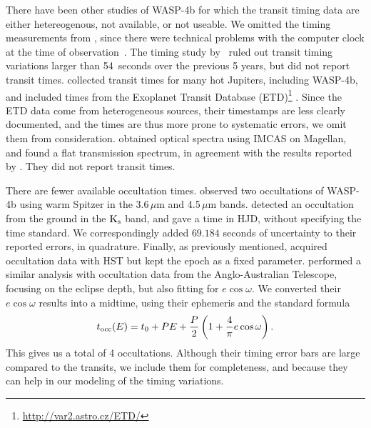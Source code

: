 \documentclass[12pt,twocolumn,tighten]{aastex62}
\begin{document}
There have been other studies of WASP-4b for which the transit timing
data are either hetereogenous, not available, or not useable.  We
omitted the timing measurements from
\citet{southworth_high-precision_2009}, since there were
technical problems with the computer clock at the time of
observation~\citep{nikolov_wasp-4b_2012}.  The timing study
by~\citet{petrucci_no_2013} ruled out transit timing variations larger
than 54~seconds over the previous 5 years, but did not report transit
times.  \citet{baluev_benchmarking_2015} collected transit times for
many hot Jupiters, including WASP-4b, and included times from the
Exoplanet Transit Database
(ETD)\footnote{\url{http://var2.astro.cz/ETD/}}
\citep{poddany_ETD_2010}.  
Since the ETD data come from heterogeneous sources, their timestamps
are less clearly documented, and the times are thus more prone to
systematic errors, we omit them from consideration.
\citet{may_mopss_2018} obtained optical spectra using IMCAS on
Magellan, and found a flat transmission spectrum, in agreement with
the results reported by \citet{huitson_gemini_2017}.  They did not
report transit times.

There are fewer available occultation times.
\citet{beerer_secondary_2011} observed two occultations of WASP-4b
using warm Spitzer in the 3.6\,$\mu$m and 4.5\,$\mu$m bands.
\citet{caceres_ground-based_2011} detected an occultation from the
ground in the ${\rm K}_{\rm s}$ band, and gave a time in HJD, without
specifying the time standard.  We correspondingly added $69.184$
seconds of uncertainty to their reported errors, in quadrature.
Finally, as previously mentioned, \citet{ranjan_atmospheric_2014}
acquired occultation data with HST but kept the epoch as a fixed
parameter.  \citet{zhou_secondary_2015} performed a similar analysis
with occultation data from the Anglo-Australian Telescope, focusing on
the eclipse depth, but also fitting for $e\cos\omega$.  We converted
their $e\cos\omega$ results into a midtime, using their ephemeris and
the standard formula
\citep[{\it e.g.},][]{charbonneau_detection_2005,winn_exoplanet_2010}
\begin{equation}
  t_{\rm occ}(E) = t_0 +  P E  +
  \frac{P}{2} \left( 1 + \frac{4}{\pi} e\cos\omega \right).
  \label{eq:occultation_time}
\end{equation}
This gives us a total of 4 occultations.  Although their timing error
bars are large compared to the transits, we include them for
completeness, and because they can help in our modeling of the timing
variations.
\end{document}
